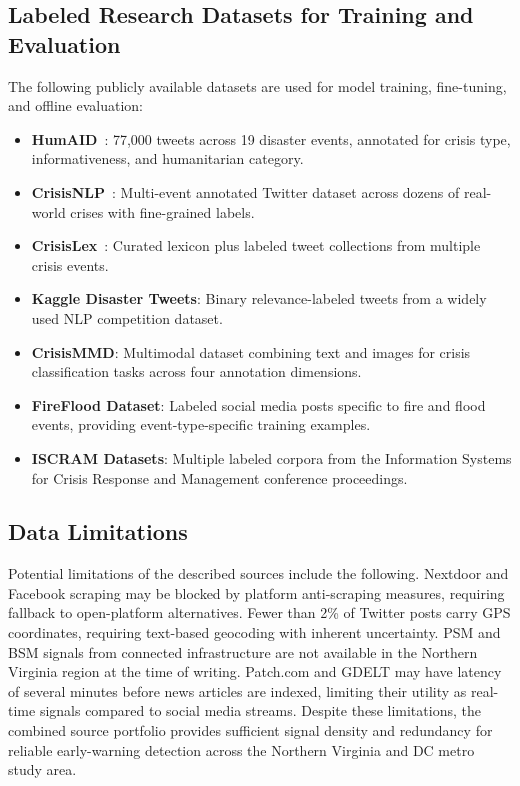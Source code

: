 \documentclass[conference]{IEEEtran}
\begin{document}
\subsection{Labeled Research Datasets for Training and Evaluation}

The following publicly available datasets are used for model training,
fine-tuning, and offline evaluation:

\begin{itemize}
    \item \textbf{HumAID}~\cite{alam2021humaid}: 77,000 tweets across 19 disaster
    events, annotated for crisis type, informativeness, and humanitarian category.
    \item \textbf{CrisisNLP}~\cite{imran2016twitter}: Multi-event annotated
    Twitter dataset across dozens of real-world crises with fine-grained labels.
    \item \textbf{CrisisLex}~\cite{olteanu2014crisislex}: Curated lexicon plus
    labeled tweet collections from multiple crisis events.
    \item \textbf{Kaggle Disaster Tweets}: Binary relevance-labeled tweets from
    a widely used NLP competition dataset.
    \item \textbf{CrisisMMD}: Multimodal dataset combining text and images for
    crisis classification tasks across four annotation dimensions.
    \item \textbf{FireFlood Dataset}: Labeled social media posts specific to fire
    and flood events, providing event-type-specific training examples.
    \item \textbf{ISCRAM Datasets}: Multiple labeled corpora from the Information
    Systems for Crisis Response and Management conference proceedings.
\end{itemize}

\subsection{Data Limitations}

Potential limitations of the described sources include the following. Nextdoor
and Facebook scraping may be blocked by platform anti-scraping measures,
requiring fallback to open-platform alternatives. Fewer than 2\% of Twitter
posts carry GPS coordinates, requiring text-based geocoding with inherent
uncertainty. PSM and BSM signals from connected infrastructure are not
available in the Northern Virginia region at the time of writing. Patch.com
and GDELT may have latency of several minutes before news articles are
indexed, limiting their utility as real-time signals compared to social media
streams. Despite these limitations, the combined source portfolio provides
sufficient signal density and redundancy for reliable early-warning detection
across the Northern Virginia and DC metro study area.
\end{document}
